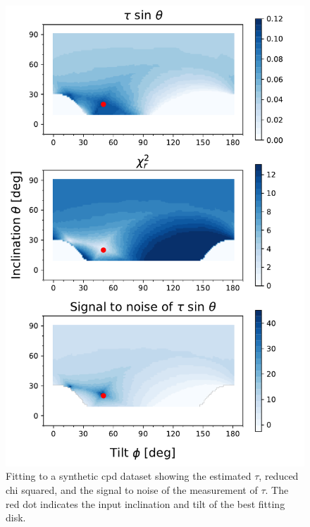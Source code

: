\documentclass[longauth]{aa} %
\begin{document}
\begin{figure}[htb]
    \includegraphics[width=\columnwidth]{simdisk_b.pdf}
    \caption{Fitting to a synthetic \ac{cpd} dataset showing the estimated $\tau$, reduced chi squared, and the signal to noise of the measurement of $\tau$.
    The red dot indicates the input inclination and tilt of the best fitting disk.}
    \label{simdisk}
\end{figure}
\end{document}
